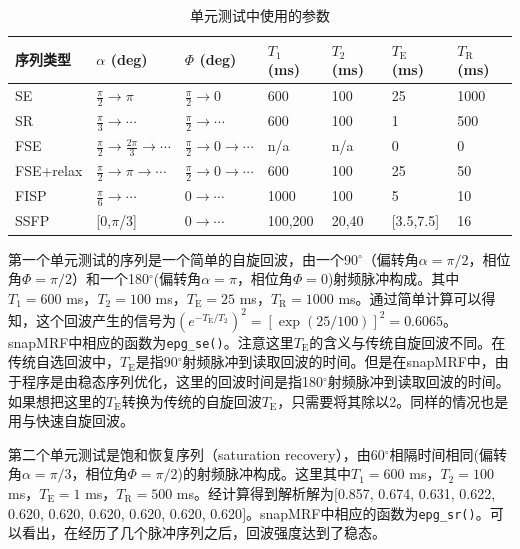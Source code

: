 \begin{table}
\centering
\caption{单元测试中使用的参数}
\begin{center}
\begin{tabular}{|l|l|l|l|l|l|l|}
\hline
\hline
序列类型 & $\alpha$ (deg) & $\Phi$ (deg) & $T_1$ (ms) & $T_2$ (ms) & $T_\mathrm{E}$ (ms) & $T_\mathrm{R}$ (ms)\\
\hline
SE & $\frac{\pi}{2}\rightarrow\pi$ & $\frac{\pi}{2}\rightarrow0$ & 600 & 100 & 25 & 1000\\
\hline
SR & $\frac{\pi}{3}\rightarrow\cdots$ & $\frac{\pi}{2}\rightarrow \cdots$ & 600 & 100 & 1 & 500\\
\hline
FSE & $\frac{\pi}{2}\rightarrow\frac{2\pi}{3}\rightarrow\cdots$ & $\frac{\pi}{2}\rightarrow0\rightarrow\cdots$ & n/a & n/a & 0 & 0\\
\hline
FSE+relax & $\frac{\pi}{2}\rightarrow\pi\rightarrow\cdots$ & $\frac{\pi}{2}\rightarrow0\rightarrow\cdots$ & 600 & 100 & 25 & 50\\
\hline
FISP & $\frac{\pi}{6}\rightarrow\cdots$ & $0\rightarrow\cdots$ & 1000 & 100 & 5 & 10\\
\hline
SSFP & [0,$\pi$/3] & $0\rightarrow\cdots$  & 100,200 & 20,40 & [3.5,7.5] & 16\\
\hline
\end{tabular}
\end{center}
\label{tab:unittest}
\end{table}

第一个单元测试的序列是一个简单的自旋回波，由一个90$^{\circ}$（偏转角$\alpha = \pi/2$，相位角$\Phi = \pi/2$）和一个180$^{\circ}$(偏转角$\alpha = \pi$，相位角$\Phi = 0$)射频脉冲构成。其中$T_1 = 600$ ms，$T_2 = 100$ ms，$T_\mathrm{E} = 25$ ms，$T_\mathrm{R} = 1000$ ms。通过简单计算可以得知，这个回波产生的信号为$(e^{-T_\mathrm{E}/T_2})^2 =[\exp(25/100)]^2=0.6065$。snapMRF中相应的函数为\texttt{epg\_se()}。注意这里$T_\mathrm{E}$的含义与传统自旋回波不同。在传统自选回波中，$T_\mathrm{E}$是指90$^{\circ}$射频脉冲到读取回波的时间。但是在snapMRF中，由于程序是由稳态序列优化，这里的回波时间是指180$^{\circ}$射频脉冲到读取回波的时间。如果想把这里的$T_\mathrm{E}$转换为传统的自旋回波$T_\mathrm{E}$，只需要将其除以2。同样的情况也是用与快速自旋回波。

第二个单元测试是饱和恢复序列（saturation recovery），由60$^{\circ}$相隔时间相同(偏转角$\alpha = \pi/3$，相位角$\Phi = \pi/2$)的射频脉冲构成。这里其中$T_1 = 600$ ms，$T_2 = 100$ ms，$T_\mathrm{E} = 1$ ms，$T_\mathrm{R} = 500$ ms。经计算得到解析解为$[$0.857, 0.674, 0.631, 0.622, 0.620, 0.620, 0.620, 0.620, 0.620, 0.620$]$。snapMRF中相应的函数为\texttt{epg\_sr()}。可以看出，在经历了几个脉冲序列之后，回波强度达到了稳态。

